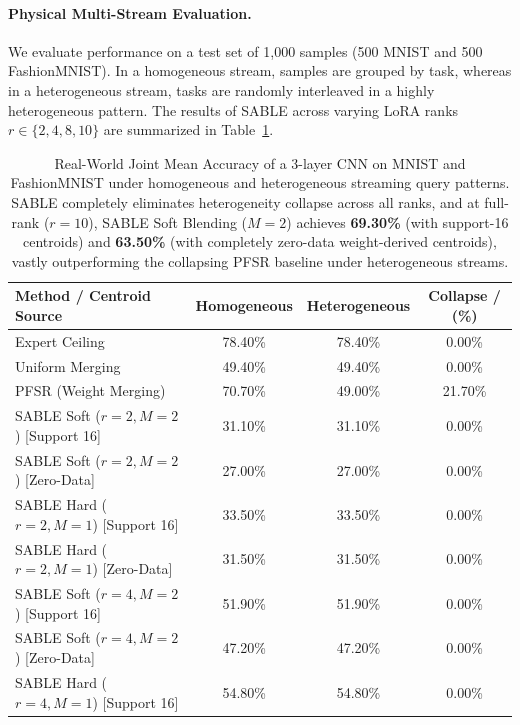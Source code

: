 \paragraph{Physical Multi-Stream Evaluation.} We evaluate performance on a test set of 1,000 samples (500 MNIST and 500 FashionMNIST). In a homogeneous stream, samples are grouped by task, whereas in a heterogeneous stream, tasks are randomly interleaved in a highly heterogeneous pattern. The results of SABLE across varying LoRA ranks $r \in \{2, 4, 8, 10\}$ are summarized in Table~\ref{tab:real_world_results}.

\begin{table}[htbp]
\caption{Real-World Joint Mean Accuracy of a 3-layer CNN on MNIST and FashionMNIST under homogeneous and heterogeneous streaming query patterns. SABLE completely eliminates heterogeneity collapse across all ranks, and at full-rank ($r=10$), SABLE Soft Blending ($M=2$) achieves \textbf{69.30\%} (with support-16 centroids) and \textbf{63.50\%} (with completely zero-data weight-derived centroids), vastly outperforming the collapsing PFSR baseline under heterogeneous streams.}
\label{tab:real_world_results}
\vskip 0.1in
\begin{center}
\begin{small}
\begin{sc}
\begin{tabular}{lccc}
\toprule
Method / Centroid Source & Homogeneous & Heterogeneous & Collapse / (\%) \\
\midrule
Expert Ceiling & 78.40\% & 78.40\% & 0.00\% \\
Uniform Merging & 49.40\% & 49.40\% & 0.00\% \\
PFSR (Weight Merging) & 70.70\% & 49.00\% & 21.70\% \\
\midrule
SABLE Soft ($r=2, M=2$) [Support 16] & 31.10\% & 31.10\% & 0.00\% \\
SABLE Soft ($r=2, M=2$) [Zero-Data] & 27.00\% & 27.00\% & 0.00\% \\
SABLE Hard ($r=2, M=1$) [Support 16] & 33.50\% & 33.50\% & 0.00\% \\
SABLE Hard ($r=2, M=1$) [Zero-Data] & 31.50\% & 31.50\% & 0.00\% \\
\midrule
SABLE Soft ($r=4, M=2$) [Support 16] & 51.90\% & 51.90\% & 0.00\% \\
SABLE Soft ($r=4, M=2$) [Zero-Data] & 47.20\% & 47.20\% & 0.00\% \\
SABLE Hard ($r=4, M=1$) [Support 16] & 54.80\% & 54.80\% & 0.00\% \\

\end{tabular}
\end{sc}
\end{small}
\end{center}
\end{table}

